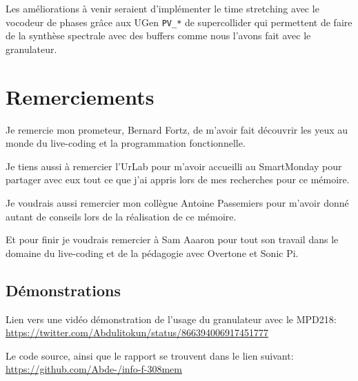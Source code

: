 \documentclass[letterpaper]{article}
\begin{document}
  Les améliorations à venir seraient d'implémenter le time stretching avec le vocodeur de phases grâce
  aux UGen \verb+PV_*+ de supercollider qui permettent de faire de la synthèse spectrale avec des
  buffers comme nous l'avons fait avec le granulateur.
  
  
  \section{Remerciements}
  Je remercie mon prometeur, Bernard Fortz, de m'avoir fait découvrir
  les yeux au monde du live-coding et la programmation fonctionnelle.

  Je tiens aussi à remercier l'UrLab pour m'avoir accueilli au SmartMonday
  pour partager avec eux tout ce que j'ai appris lors de mes recherches
  pour ce mémoire.

  Je voudrais aussi remercier mon collègue Antoine Passemiers pour m'avoir donné autant de conseils
  lors de la réalisation de ce mémoire.

  Et pour finir je voudrais remercier à Sam Aaaron pour tout son travail dans le domaine du live-coding
  et de la pédagogie avec Overtone et Sonic Pi.

\footnotesize





\begin{appendices}
  \section{Démonstrations}
  Lien vers une vidéo démonstration de l'usage du granulateur avec le MPD218: 
  \url{https://twitter.com/Abdulitokun/status/866394006917451777}

  Le code source, ainsi que le rapport se trouvent dans le lien suivant:
  \url{https://github.com/Abde-/info-f-308mem}

  
\end{appendices}
\end{document}

